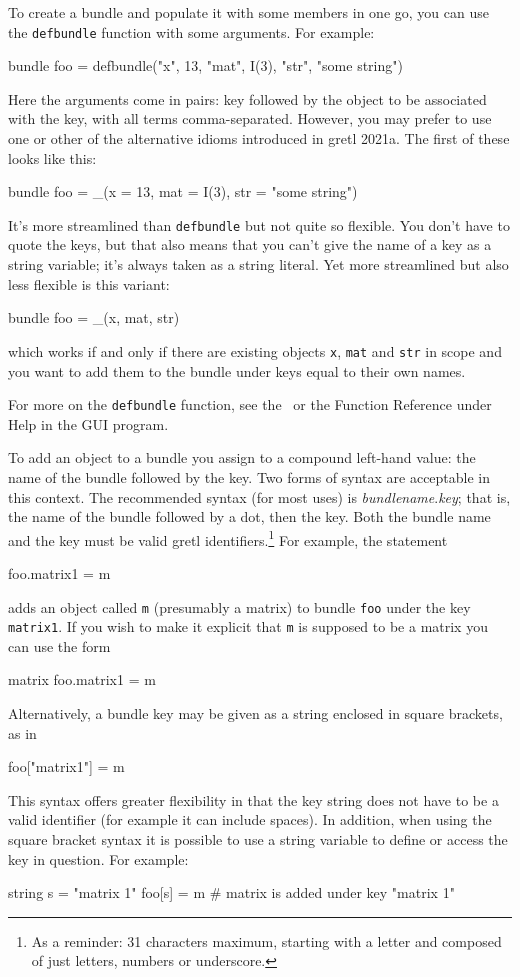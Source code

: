 To create a bundle and populate it with some members in one go, you
can use the \texttt{defbundle} function with some arguments. For
example:
\begin{code}
bundle foo = defbundle("x", 13, "mat", I(3), "str", "some string")
\end{code}
Here the arguments come in pairs: key followed by the object to be
associated with the key, with all terms comma-separated. However, you
may prefer to use one or other of the alternative idioms introduced in
gretl 2021a. The first of these looks like this:
\begin{code}
bundle foo = _(x = 13, mat = I(3), str = "some string")
\end{code}
It's more streamlined than \texttt{defbundle} but not quite so
flexible. You don't have to quote the keys, but that also means that
you can't give the name of a key as a string variable; it's always
taken as a string literal. Yet more streamlined but also less flexible
is this variant:
\begin{code}
bundle foo = _(x, mat, str)
\end{code}
which works if and only if there are existing objects \texttt{x},
\texttt{mat} and \texttt{str} in scope and you want to add them to the
bundle under keys equal to their own names.

For more on the \texttt{defbundle} function, see the \GCR\ or the
\textsf{Function Reference} under \textsf{Help} in the GUI program.

To add an object to a bundle you assign to a compound left-hand value:
the name of the bundle followed by the key. Two forms of syntax are
acceptable in this context. The recommended syntax (for most uses) is
\textsl{bundlename}.\textsl{key}; that is, the name of the bundle
followed by a dot, then the key. Both the bundle name and the key must
be valid gretl identifiers.\footnote{As a reminder: 31 characters
  maximum, starting with a letter and composed of just letters,
  numbers or underscore.} For example, the statement
%
\begin{code}
foo.matrix1 = m
\end{code}
%
adds an object called \texttt{m} (presumably a matrix) to bundle
\texttt{foo} under the key \texttt{matrix1}. If you wish to make it
explicit that \texttt{m} is supposed to be a matrix you can use the
form
%
\begin{code}
matrix foo.matrix1 = m
\end{code}

Alternatively, a bundle key may be given as a string enclosed in
square brackets, as in
%
\begin{code}
foo["matrix1"] = m
\end{code}
%
This syntax offers greater flexibility in that the key string does not
have to be a valid identifier (for example it can include spaces). In
addition, when using the square bracket syntax it is possible to use a
string variable to define or access the key in question. For example:
%
\begin{code}
string s = "matrix 1"
foo[s] = m # matrix is added under key "matrix 1"
\end{code}

